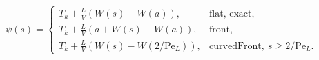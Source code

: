 $$
\psi(s) = \begin{cases}
T_k + \frac{L}{V} \left(W(s) - W(a)\right), & \text{flat, exact},\\
T_k + \frac{L}{V} \left(a + W(s) - W(a)\right), & \text{front},\\
T_k + \frac{L}{V} \left(W(s) - W(2/\mathrm{Pe}_L)\right), & \text{curvedFront},\ s\ge 2/\mathrm{Pe}_L.
\end{cases}
$$
